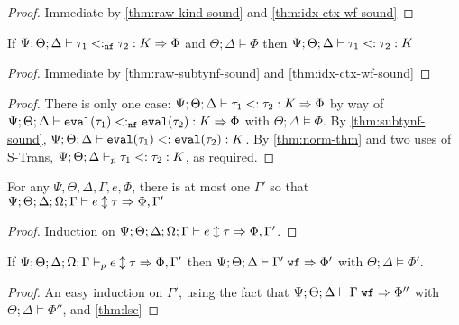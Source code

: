 \kindsound*
\begin{proof}
Immediate by \autoref{thm:raw-kind-sound} and \autoref{thm:idx-ctx-wf-sound}
\end{proof}

\begin{theorem}
If $\Psi ; \Theta ; \Delta \vdash \tau_1 <:_{\texttt{nf}} \tau_2 : K \Rightarrow \Phi$ and $\Theta ; \Delta \vDash \Phi$ then $\Psi ; \Theta ; \Delta \vdash \tau_1 <: \tau_2 : K$\label{thm:raw-subtynf-sound}
\end{theorem}

\subtynfsound*
\begin{proof}
Immediate by \autoref{thm:raw-subtynf-sound} and \autoref{thm:idx-ctx-wf-sound}
\end{proof}

\subtysound*
\begin{proof}
There is only one case: $\Psi ; \Theta ; \Delta \vdash \tau_1 <:\tau_2 : K \Rightarrow \Phi$ by way of $\Psi ; \Theta ; \Delta \vdash \texttt{eval}(\tau_1) <:_{\texttt{nf}} \texttt{eval}(\tau_2) : K \Rightarrow \Phi$ with $\Theta ; \Delta \vDash \Phi$. By \autoref{thm:subtynf-sound}, $\Psi ; \Theta ; \Delta \vdash \texttt{eval}(\tau_1) <: \texttt{eval}(\tau_2) : K$. By \autoref{thm:norm-thm} and two uses of S-Trans, $\Psi ; \Theta ; \Delta \vdash_p \tau_1 <: \tau_2 : K$, as required.
\end{proof}

\begin{theorem}
For any $\Psi,\Theta,\Delta,\Gamma,e,\Phi$, there is at most one $\Gamma'$ so that $\Psi ; \Theta ; \Delta ; \Omega ; \Gamma \vdash e \updownarrow \tau \Rightarrow \Phi, \Gamma'$
\label{thm:ctx-uniquely-determined}
\end{theorem}

\lsc*
\begin{proof}
Induction on $\Psi ; \Theta ; \Delta ; \Omega ; \Gamma \vdash e \updownarrow \tau \Rightarrow \Phi, \Gamma'$.
\end{proof}

\begin{theorem}
If $\Psi ; \Theta ; \Delta ; \Omega ; \Gamma \vdash_p e \updownarrow \tau \Rightarrow \Phi,\Gamma'$ then $\Psi ; \Theta ; \Delta \vdash \Gamma' \; \texttt{wf} \Rightarrow \Phi'$ with $\Theta ; \Delta \vDash \Phi'$.
\end{theorem}
\begin{proof}
An easy induction on $\Gamma'$, using the fact that $\Psi ; \Theta ; \Delta \vdash \Gamma \; \texttt{wf} \Rightarrow \Phi''$ with $\Theta ; \Delta \vDash \Phi''$, and \autoref{thm:lsc}
\end{proof}

